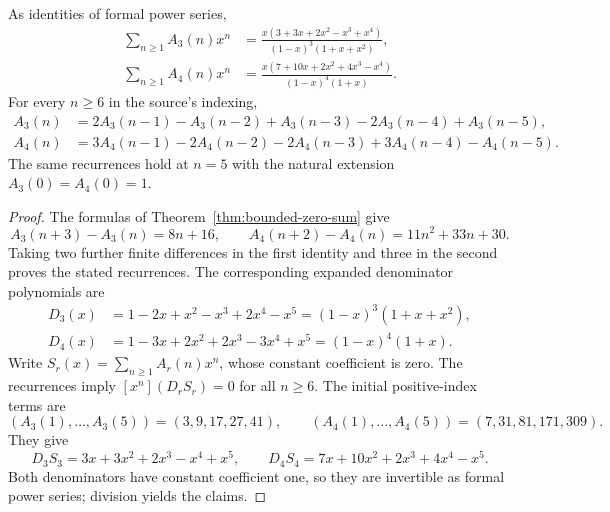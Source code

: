 \begin{theorem}\label{thm:bounded-zero-sum-gf}
As identities of formal power series,
\begin{align*}
 \sum_{n\ge1}A_3(n)x^n
   &=\frac{x(3+3x+2x^2-x^3+x^4)}{(1-x)^3(1+x+x^2)},\\
 \sum_{n\ge1}A_4(n)x^n
   &=\frac{x(7+10x+2x^2+4x^3-x^4)}{(1-x)^4(1+x)}.
\end{align*}
For every $n\ge6$ in the source's indexing,
\begin{align*}
 A_3(n)&=2A_3(n-1)-A_3(n-2)+A_3(n-3)
                    -2A_3(n-4)+A_3(n-5),\\
 A_4(n)&=3A_4(n-1)-2A_4(n-2)-2A_4(n-3)
                    +3A_4(n-4)-A_4(n-5).
\end{align*}
The same recurrences hold at $n=5$ with the natural extension
$A_3(0)=A_4(0)=1$.
\end{theorem}

\begin{proof}
The formulas of Theorem~\ref{thm:bounded-zero-sum} give
\[
 A_3(n+3)-A_3(n)=8n+16,\qquad
 A_4(n+2)-A_4(n)=11n^2+33n+30.
\]
Taking two further finite differences in the first identity and three
in the second proves the stated recurrences. The corresponding
expanded denominator polynomials are
\begin{align*}
 D_3(x)&=1-2x+x^2-x^3+2x^4-x^5
          =(1-x)^3(1+x+x^2),\\
 D_4(x)&=1-3x+2x^2+2x^3-3x^4+x^5
          =(1-x)^4(1+x).
\end{align*}
Write $S_r(x)=\sum_{n\ge1}A_r(n)x^n$, whose constant coefficient is
zero. The recurrences imply $[x^n](D_rS_r)=0$ for all $n\ge6$.
The initial positive-index terms are
\[
 (A_3(1),\ldots,A_3(5))=(3,9,17,27,41),\qquad
 (A_4(1),\ldots,A_4(5))=(7,31,81,171,309).
\]
They give
\[
 D_3S_3=3x+3x^2+2x^3-x^4+x^5,\qquad
 D_4S_4=7x+10x^2+2x^3+4x^4-x^5.
\]
Both denominators have constant coefficient one, so they are
invertible as formal power series; division yields the claims.
\end{proof}

